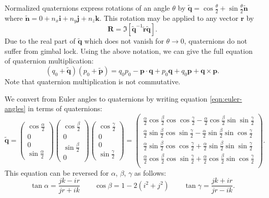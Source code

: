 \documentclass[11pt]{article}
\newcommand{\parens}[1]{\left( #1 \right)}
\newcommand{\brackets}[1]{\left[ #1 \right]}
\newcommand{\quat}[1]{\widetilde{\bm{#1}}}
\begin{document}
Normalized quaternions express rotations of an angle $\theta$ by $\quat q = \cos\frac{\theta}{2} + \sin\frac{\theta}{2}\quat n$ where $\quat n = 0 + n_x \bm i + n_y \bm j + n_z\bm k$. This rotation may be applied to any vector $\bm r$ by
\begin{equation}
\bm R = \Im \brackets{\quat q^{-1} \quat r\quat q }.
\label{eqn:quat-rot}
\end{equation}
Due to the real part of $\quat q$ which does not vanish for $\theta \rightarrow 0$, quaternions do not suffer from gimbal lock. Using the above notation, we can give the full equation of quaternion multiplication:
\begin{equation}
(q_0 + \quat q) (p_0 + \quat p) = q_0 p_0 - \bm p \cdot \bm q + p_0 \bm q + q_0 \bm p + \bm q \times \bm p.
\label{eqn:quat-mult}
\end{equation}
Note that quaternion multiplication is not commutative.


We convert from Euler angles to quaternions by writing equation \ref{eqn:euler-angles} in terms of quaternions:
\begin{equation}
\quat q = \parens{\begin{matrix} \cos \frac{\alpha}{2} \\ 0\\ 0 \\\sin \frac{\alpha}{2}\end{matrix}}
\parens{\begin{matrix} \cos \frac{\beta}{2} \\ 0 \\\sin \frac{\beta}{2}\\ 0\end{matrix}}
\parens{\begin{matrix} \cos \frac{\gamma}{2} \\ 0\\ 0 \\\sin \frac{\gamma}{2}\end{matrix}} = \parens{\begin{matrix}
\frac{\alpha}{2} \cos \frac{\beta}{2} \cos  \cos \frac{\gamma}{2} - \frac{\alpha}{2} \cos \frac{\beta}{2}\sin \sin \frac{\gamma}{2}\\
\frac{\alpha}{2} \sin \frac{\beta}{2} \cos  \sin \frac{\gamma}{2} - \frac{\alpha}{2} \sin \frac{\beta}{2}\sin \cos \frac{\gamma}{2}\\
\frac{\alpha}{2} \sin \frac{\beta}{2} \cos  \cos \frac{\gamma}{2} + \frac{\alpha}{2} \sin \frac{\beta}{2}\sin \sin \frac{\gamma}{2}\\
\frac{\alpha}{2} \cos \frac{\beta}{2} \cos  \sin \frac{\gamma}{2} + \frac{\alpha}{2} \cos \frac{\beta}{2}\sin \cos \frac{\gamma}{2}\\
\end{matrix}}.
\label{eqn:euler-to-quat}
\end{equation}
This equation can be reversed for $\alpha$, $\beta$, $\gamma$ as follows:
\begin{equation}
\tan \alpha = \frac{jk - ir}{jr + ik}\qquad \cos \beta = 1 - 2(i^2 + j^2) \qquad \tan \gamma = \frac{jk + ir}{jr - ik} .
\label{eqn:quat-to-euler}
\end{equation}
\end{document}
